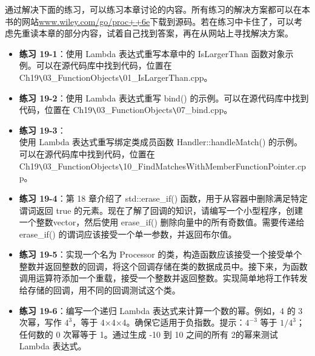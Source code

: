 通过解决下面的练习，可以练习本章讨论的内容。所有练习的解决方案都可以在本书的网站\url{www.wiley.com/go/proc++6e}下载到源码。若在练习中卡住了，可以考虑先重读本章的部分内容，试着自己找到答案，再在从网站上寻找解决方案。

\begin{itemize}
\item
\textbf{练习 19-1}：使用 Lambda 表达式重写本章中的 IsLargerThan 函数对象示例。可以在源代码库中找到代码，位置在 Ch19\verb|\|03\_FunctionObjects\verb|\|01\_IsLargerThan.cpp。

\item
\textbf{练习 19-2}：使用 Lambda 表达式重写 bind() 的示例。可以在源代码库中找到代码，位置在 Ch19\verb|\|03\_FunctionObjects\verb|\|07\_bind.cpp。

\item
\textbf{练习 19-3}：\\使用 Lambda 表达式重写绑定类成员函数 Handler::handleMatch() 的示例。可以在源代码库中找到代码，位置在 Ch19\verb|\|03\_FunctionObjects\verb|\|10\_FindMatchesWithMemberFunctionPointer.cpp。

\item
\textbf{练习 19-4}：第 18 章介绍了 std::erase\_if() 函数，用于从容器中删除满足特定谓词返回 true 的元素。现在了解了回调的知识，请编写一个小型程序，创建一个整数vector，然后使用 erase\_if() 删除向量中的所有奇数值。需要传递给 erase\_if() 的谓词应该接受一个单一参数，并返回布尔值。

\item
\textbf{练习 19-5}：实现一个名为 Processor 的类，构造函数应该接受一个接受单个整数并返回整数的回调，将这个回调存储在类的数据成员中。接下来，为函数调用运算符添加一个重载，接受一个整数并返回整数。实现简单地将工作转发给存储的回调，用不同的回调测试这个类。

\item
\textbf{练习 19-6}：编写一个递归 Lambda 表达式来计算一个数的幂。例如，4 的 3 次幂，写作 $4^3$，等于 4×4×4。确保它适用于负指数。提示：$4^{-3}$ 等于 $1/4^3$；任何数的 0 次幂等于 1。通过生成 -10 到 10 之间的所有 2的幂来测试 Lambda 表达式。
\end{itemize}